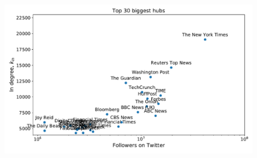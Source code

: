 \documentclass[11pt, twoside]{report}
\begin{document}
    \begin{figure}[htbp]
      \centering
      \includegraphics[width=\textwidth]{../../scripts/network_analysis/imgs/hubs_followers.pdf}
      \caption{}
      \label{fig:hubs_followers}
    \end{figure}
\end{document}
